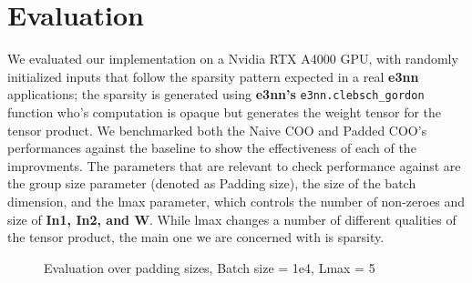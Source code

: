 \section{Evaluation}
\label{sec:eval}

We evaluated our implementation on a Nvidia RTX A4000 GPU, with randomly initialized inputs that follow the sparsity pattern 
expected in a real \textbf{e3nn} applications; the sparsity is generated using  \textbf{e3nn's} \texttt{e3nn.clebsch\_gordon} function
who's computation is opaque but generates the weight tensor for the tensor product. We benchmarked both the Naive COO and Padded COO's performances
against the baseline to show the effectiveness of each of the improvments. The parameters that are relevant to check performance against are
the group size parameter (denoted as Padding size), the size of the batch dimension, and the lmax parameter, which controls the number of 
non-zeroes and size of \textbf{In1, In2, and W}. While lmax changes a number of different qualities of the tensor product, the main
one we are concerned with is sparsity.

\begin{figure}[h]
    \centering
    \caption{Evaluation over padding sizes, Batch size = 1e4, Lmax = 5}
    \label{fig:eval1}
\end{figure}
